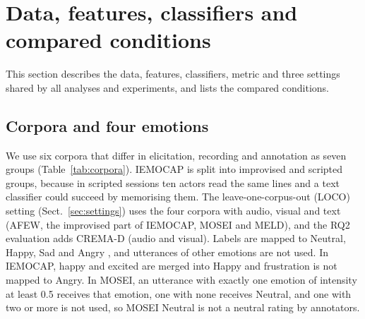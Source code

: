 \section{Data, features, classifiers and compared conditions}\label{sec:setup}

This section describes the data, features, classifiers, metric and three settings shared by all analyses and experiments, and lists the compared conditions.

\subsection{Corpora and four emotions}
We use six corpora that differ in elicitation, recording and annotation as seven groups (Table~\ref{tab:corpora}). IEMOCAP \cite{busso2008iemocap} is split into improvised and scripted groups, because in scripted sessions ten actors read the same lines and a text classifier could succeed by memorising them. The leave-one-corpus-out (LOCO) setting (Sect.~\ref{sec:settings}) uses the four corpora with audio, visual and text (AFEW, the improvised part of IEMOCAP, MOSEI and MELD), and the RQ2 evaluation adds CREMA-D (audio and visual). Labels are mapped to Neutral, Happy, Sad and Angry \cite{ryumina2025}, and utterances of other emotions are not used. In IEMOCAP, happy and excited are merged into Happy and frustration is not mapped to Angry. In MOSEI, an utterance with exactly one emotion of intensity at least 0.5 receives that emotion, one with none receives Neutral, and one with two or more is not used, so MOSEI Neutral is not a neutral rating by annotators.

